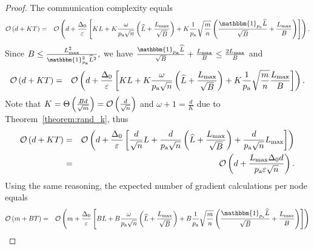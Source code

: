 \documentclass{article}
\newcommand*{\probavailable}{\ensuremath{p_{\textnormal{a}}}}
\begin{document}
  \begin{proof}
    The communication complexity equals
    \begin{eqnarray*}
        \cO\left(d + K T\right) &=& \cO\left(d + \frac{\Delta_0}{\varepsilon}\left[K L + K \frac{\omega}{\probavailable\sqrt{n}}\left(\widehat{L} + \frac{L_{\max}}{\sqrt{B}}\right) + K \frac{1}{\probavailable}\sqrt{\frac{m}{n}}\left(\frac{\mathbbm{1}_{\probavailable}\widehat{L}}{\sqrt{B}} + \frac{L_{\max}}{B}\right)\right]\right).
    \end{eqnarray*}
    Since $B \leq \frac{L_{\max}^2}{\mathbbm{1}_{\probavailable}^2 \widehat{L}^2},$ we have $\frac{\mathbbm{1}_{\probavailable}\widehat{L}}{\sqrt{B}} + \frac{L_{\max}}{B} \leq \frac{2 L_{\max}}{B}$ and 
    \begin{eqnarray*}
      \cO\left(d + K T\right) &=& \cO\left(d + \frac{\Delta_0}{\varepsilon}\left[K L + K \frac{\omega}{\probavailable\sqrt{n}}\left(\widehat{L} + \frac{L_{\max}}{\sqrt{B}}\right) + K \frac{1}{\probavailable}\sqrt{\frac{m}{n}}\frac{L_{\max}}{B}\right]\right).
    \end{eqnarray*}
    Note that $K = \Theta\left(\frac{B d}{\sqrt{m}}\right) = \mathcal{O}\left(\frac{d}{\sqrt{n}}\right)$ and $\omega + 1 = \frac{d}{K}$ due to Theorem~\ref{theorem:rand_k}, thus 
    \begin{eqnarray*}
      \cO\left(d + K T\right) &=& \cO\left(d + \frac{\Delta_0}{\varepsilon}\left[\frac{d}{\sqrt{n}} L + \frac{d}{\probavailable\sqrt{n}}\left(\widehat{L} + \frac{L_{\max}}{\sqrt{B}}\right) + \frac{d}{\probavailable \sqrt{n}}L_{\max}\right]\right) \\
      &=& \cO\left(d + \frac{L_{\max} \Delta_0 d}{\probavailable \varepsilon \sqrt{n}}\right).
    \end{eqnarray*}
    Using the same reasoning, the expected number of gradient calculations per node equals
    \begin{eqnarray*}
        \cO\left(m + B T\right) &=& \cO\left(m + \frac{\Delta_0}{\varepsilon}\left[B L + B \frac{\omega}{\probavailable\sqrt{n}}\left(\widehat{L} + \frac{L_{\max}}{\sqrt{B}}\right) + B \frac{1}{\probavailable}\sqrt{\frac{m}{n}}\left(\frac{\mathbbm{1}_{\probavailable}\widehat{L}}{\sqrt{B}} + \frac{L_{\max}}{B}\right)\right]\right) \\

\end{eqnarray*}
\end{proof}
\end{document}
